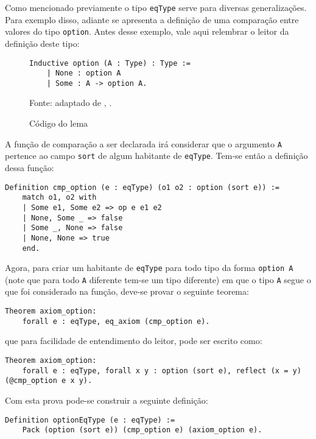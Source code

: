 Como mencionado previamente o tipo \lstinline[language = coq]$eqType$ serve para diversas generalizações. Para exemplo disso, adiante se apresenta a definição de uma comparação entre valores do tipo \lstinline[language = coq]$option$. Antes desse exemplo, vale aqui relembrar o leitor da definição deste tipo:
\begin{figure}[h]
    \centering
    \caption{Código do lema }
    \begin{lstlisting}[language = coq,frame=single,tabsize=1]
Inductive option (A : Type) : Type :=
    | None : option A
    | Some : A -> option A.
    \end{lstlisting}
\footnotesize{Fonte: adaptado de \citeauthor{coqteam2022manual}, \citeyear{coqteam2022manual}.}
    \label{fig:inductive-option}
    \end{figure}
A função de comparação a ser declarada irá considerar que o argumento \lstinline[language = coq]$A$ pertence ao campo \lstinline[language = coq]$sort$ de algum habitante de \lstinline[language = coq]$eqType$. Tem-se então a definição dessa função:
    \begin{lstlisting}[language = coq,frame=single,tabsize=1]
Definition cmp_option (e : eqType) (o1 o2 : option (sort e)) :=
    match o1, o2 with
    | Some e1, Some e2 => op e e1 e2
    | None, Some _ => false
    | Some _, None => false
    | None, None => true
    end.
    \end{lstlisting}
Agora, para criar um habitante de \lstinline[language = coq]$eqType$ para todo tipo da forma \lstinline[language = coq]$option A$ (note que para todo \lstinline[language = coq]$A$ diferente tem-se um tipo diferente) em que o tipo \lstinline[language = coq]$A$ segue o que foi considerado na função, deve-se provar o seguinte teorema:
    \begin{lstlisting}[language = coq,frame=single,tabsize=1]
Theorem axiom_option: 
    forall e : eqType, eq_axiom (cmp_option e).
    \end{lstlisting}
que para facilidade de entendimento do leitor, pode ser escrito como:
    \begin{lstlisting}[language = coq,frame=single,tabsize=1]
Theorem axiom_option: 
    forall e : eqType, forall x y : option (sort e), reflect (x = y) (@cmp_option e x y).
    \end{lstlisting}
Com esta prova pode-se construir a seguinte definição:
    \begin{lstlisting}[language = coq,frame=single,tabsize=1]
Definition optionEqType (e : eqType) := 
    Pack (option (sort e)) (cmp_option e) (axiom_option e).
    \end{lstlisting}
